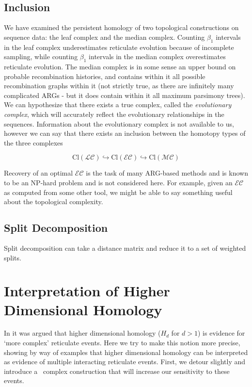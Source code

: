 \subsection{Inclusion}
%
We have examined the persistent homology of two topological constructions on sequence data: the leaf complex and the median complex.
Counting $\beta_1$ intervals in the leaf complex underestimates reticulate evolution because of incomplete sampling, while counting $\beta_1$ intervals in the median complex overestimates reticulate evolution.
The median complex is in some sense an upper bound on probable recombination histories, and contains within it all possible recombination graphs within it (not strictly true, as there are infinitely many complicated ARGs - but it does contain within it all maximum parsimony trees).
We can hypothesize that there exists a true complex, called the \emph{evolutionary complex}, which will accurately reflect the evolutionary relationships in the sequences.
Information about the evolutionary complex is not available to us, however we can say that there exists an inclusion between the homotopy types of the three complexes

\begin{equation}
 \mathrm{Cl}(\mathcal{LC}) \hookrightarrow \mathrm{Cl}(\mathcal{EC}) \hookrightarrow \mathrm{Cl}(\mathcal{MC})
\end{equation}

Recovery of an optimal $\mathcal{EC}$ is the task of many ARG-based methods and is known to be an NP-hard problem and is not considered here.
For example, given an $\mathcal{EC}$ as computed from some other tool, we might be able to say something useful about the topological complexity.

\subsection{Split Decomposition}

Split decomposition can take a distance matrix and reduce it to a set of weighted splits.


\section{Interpretation of Higher Dimensional Homology}
\label{sec:higher_homology}

In \citet{Chan:2013} it was argued that higher dimensional homology ($H_d$ for $d>1$) is evidence for `more complex' reticulate events.
Here we try to make this notion more precise, showing by way of examples that higher dimensional homology can be interpreted as evidence of multiple interacting reticulate events.
First, we detour slightly and introduce a \Cech\ complex construction that will increase our sensitivity to these events.


